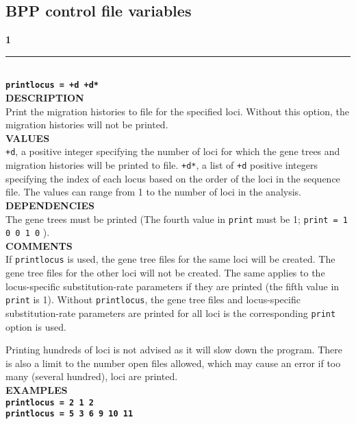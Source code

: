 \documentclass[11pt]{article}
\begin{document}
\subsection{BPP control file variables} \label{controlfilevariables}
\textbf{{\large 1}} \\
\noindent\rule{\textwidth}{0.8pt} \\
\textbf{{\Large \texttt{printlocus = +d +d* }}} \vspace{5pt}\\
\textbf{DESCRIPTION} \vspace{5pt}\\
Print the migration histories to file for the specified loci. Without this option, the migration histories will not be printed. 
\vspace{5pt}\\
\textbf{VALUES} \vspace{5pt}\\
\texttt{+d}, a positive integer specifying the number of loci for which the gene trees and migration histories will be printed to file. \texttt{+d*}, a list of \texttt{+d} positive integers specifying the index of each locus based on the order of the loci in the sequence file. The values can range from 1 to the number of loci in the analysis.\vspace{10pt}\\
\textbf{DEPENDENCIES} \vspace{5pt}\\
The gene trees must be printed (The fourth value in \texttt{print} must be 1; \texttt{print = 1 0 0 1 0} ). 
 \vspace{5pt}\\
\textbf{COMMENTS} \vspace{5pt}\\
If \texttt{printlocus} is used, the gene tree files for the same loci will be created. The gene tree files for the other loci will not be created. The same applies to the locus-specific substitution-rate parameters if they are printed (the fifth value in \texttt{print} is 1). 
Without \texttt{printlocus}, the gene tree files and locus-specific substitution-rate parameters are printed for all loci is the corresponding \texttt{print} option is used.

Printing hundreds of loci is not advised as it will slow down the program. There is also a limit to the number open files allowed, which may cause an error if too many (several hundred), loci are printed. 
 \vspace{5pt}\\
\textbf{EXAMPLES} \vspace{5pt}\\
\textbf{\texttt{printlocus = 2 1 2}}\vspace{5pt}\\
\textbf{\texttt{printlocus = 5 3 6 9 10 11 }}\vspace{10pt}\\
\end{document}
